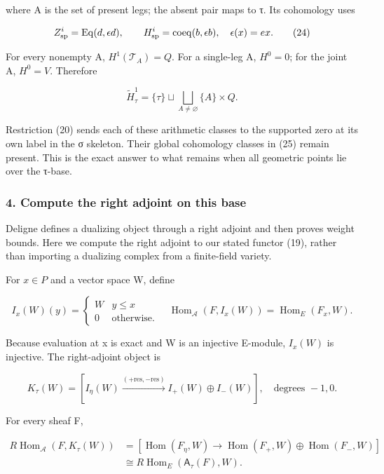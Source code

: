 \documentclass{article}
\begin{document}
where A is the set of present legs; the absent pair maps to τ. Its cohomology uses

\[
Z^i_{\rm sp}=\operatorname{Eq}(d,\epsilon d),
\qquad
H^i_{\rm sp}=\operatorname{coeq}(b,\epsilon b),
\quad\epsilon(x)=ex.
\tag{24}
\]

For every nonempty A, \(H^1(\mathcal T_A)=Q\). For a single-leg A, \(H^0=0\); for the joint A, \(H^0=V\). Therefore

\[
\widetilde H^1_\tau
=\{\tau\}\sqcup\bigsqcup_{A\ne\varnothing}\{A\}\times Q.
\tag{25}
\]

Restriction (20) sends each of these arithmetic classes to the supported zero at its own label in the σ skeleton. Their global cohomology classes in (25) remain present. This is the exact answer to what remains when all geometric points lie over the τ-base.

\subsubsection{4. Compute the right adjoint on this base}\label{endpoint-tau_base--compute-the-right-adjoint-on-this-base}

Deligne defines a dualizing object through a right adjoint and then proves weight bounds. Here we compute the right adjoint to our stated functor (19), rather than importing a dualizing complex from a finite-field variety.

For \(x\in P\) and a vector space W, define

\[
I_x(W)(y)=\begin{cases}W&y\le x\\0&\text{otherwise}.\end{cases}
\quad
\operatorname{Hom}_{\mathcal A}(F,I_x(W))
=\operatorname{Hom}_E(F_x,W).
\tag{26}
\]

Because evaluation at x is exact and W is an injective E-module, \(I_x(W)\) is injective. The right-adjoint object is

\[
\boxed{
K_\tau(W)=
[I_\eta(W)\xrightarrow{(+\mathrm{res},-\mathrm{res})}
 I_+(W)\oplus I_-(W)],
\quad\text{degrees }-1,0.
}
\tag{27}
\]

For every sheaf F,

\[
\begin{aligned}
R\operatorname{Hom}_{\mathcal A}(F,K_\tau(W))
&=[\operatorname{Hom}(F_\eta,W)
 \longrightarrow\operatorname{Hom}(F_+,W)\oplus\operatorname{Hom}(F_-,W)]\\
&\cong R\operatorname{Hom}_E(\mathsf A_\tau(F),W).
\end{aligned}
\tag{28}
\]
\end{document}
